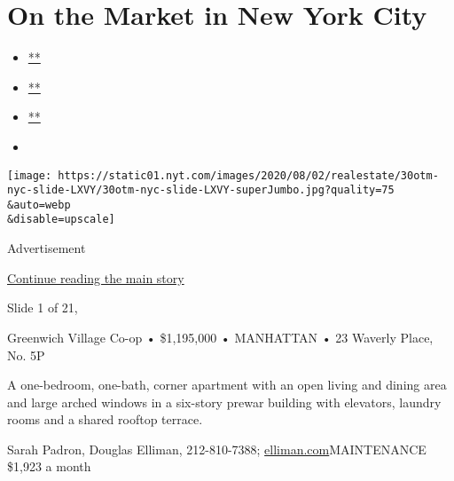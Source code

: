 \hypertarget{on-the-market-in-new-york-city}{%
\section{On the Market in New York
City}\label{on-the-market-in-new-york-city}}

\begin{itemize}
\item
  \href{https://www.facebook.com/sharer.php?app_id=9869919170\&u=https\%3A\%2F\%2Fwww.nytimes.com\%2Fslideshow\%2F2020\%2F07\%2F30\%2Frealestate\%2Fon-the-market-in-new-york-city.html\%3Fsmid\%3Dfb-share\&name=On\%20the\%20Market\%20in\%20New\%20York\%20City\&redirect_uri=https\%3A\%2F\%2Fwww.facebook.com\%2F}{**}
\item
  \href{https://twitter.com/intent/tweet?url=https\%3A\%2F\%2Fwww.nytimes.com\%2Fslideshow\%2F2020\%2F07\%2F30\%2Frealestate\%2Fon-the-market-in-new-york-city.html\%3Fsmid\%3Dtw-share\&text=On\%20the\%20Market\%20in\%20New\%20York\%20City}{**}
\item
  \href{mailto:?subject=NYTimes.com\%3A\%20On\%20the\%20Market\%20in\%20New\%20York\%20City\&body=From\%20The\%20New\%20York\%20Times\%3A\%0A\%0AOn\%20the\%20Market\%20in\%20New\%20York\%20City\%0A\%0AThis\%20week\%E2\%80\%99s\%20properties\%20are\%20on\%20in\%20Greenwich\%20Village\%2C\%20Cobble\%20Hill\%20and\%20on\%20the\%20Grand\%20Concourse.\%0A\%0Ahttps\%3A\%2F\%2Fwww.nytimes.com\%2Fslideshow\%2F2020\%2F07\%2F30\%2Frealestate\%2Fon-the-market-in-new-york-city.html\%3Fsmid\%3Dem-share}{**}
\item
\end{itemize}

\texttt{[image: https://static01.nyt.com/images/2020/08/02/realestate/30otm-nyc-slide-LXVY/30otm-nyc-slide-LXVY-superJumbo.jpg?quality=75\\\&auto=webp\\\&disable=upscale]}

Advertisement

\protect\hyperlink{after-right-0}{Continue reading the main story}

Slide 1 of 21,

Greenwich Village Co-op • \$1,195,000 • MANHATTAN • 23 Waverly Place,
No. 5P

A one-bedroom, one-bath, corner apartment with an open living and dining
area and large arched windows in a six-story prewar building with
elevators, laundry rooms and a shared rooftop terrace.

Sarah Padron, Douglas Elliman, 212-810-7388;
\href{https://www.nytimes.com/real-estate/usa/ny/new-york/greenwich-village/homes-for-sale/waverly-mews-23-waverly-pl/46-4121624?channel=sale}{elliman.com}MAINTENANCE
\$1,923 a month


